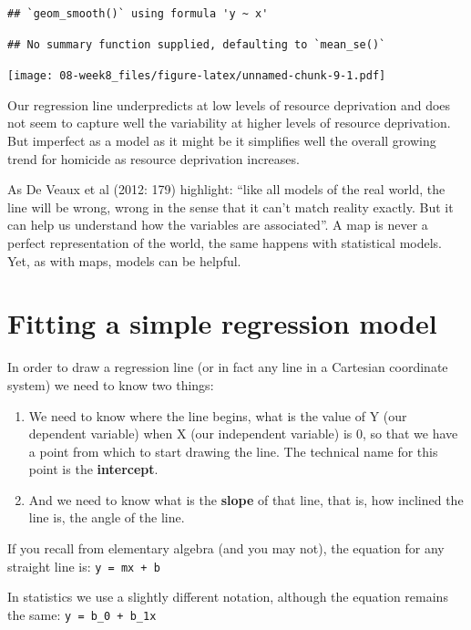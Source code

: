\documentclass[]{book}
\providecommand{\tightlist}{%
  \setlength{\itemsep}{0pt}\setlength{\parskip}{0pt}}
\begin{document}
\begin{verbatim}
## `geom_smooth()` using formula 'y ~ x'
\end{verbatim}

\begin{verbatim}
## No summary function supplied, defaulting to `mean_se()`
\end{verbatim}

\texttt{[image: 08-week8\_files/figure-latex/unnamed-chunk-9-1.pdf]}

Our regression line underpredicts at low levels of resource deprivation and does not seem to capture well the variability at higher levels of resource deprivation. But imperfect as a model as it might be it simplifies well the overall growing trend for homicide as resource deprivation increases.

As De Veaux et al (2012: 179) highlight: ``like all models of the real world, the line will be wrong, wrong in the sense that it can't match reality exactly. But it can help us understand how the variables are associated''. A map is never a perfect representation of the world, the same happens with statistical models. Yet, as with maps, models can be helpful.

\hypertarget{fitting-a-simple-regression-model}{%
\section{Fitting a simple regression model}\label{fitting-a-simple-regression-model}}

In order to draw a regression line (or in fact any line in a Cartesian coordinate system) we need to know two things:

\begin{enumerate}
\def\labelenumi{\arabic{enumi})}
\tightlist
\item
  We need to know where the line begins, what is the value of Y (our dependent variable) when X (our independent variable) is 0, so that we have a point from which to start drawing the line. The technical name for this point is the \textbf{intercept}.
\item
  And we need to know what is the \textbf{slope} of that line, that is, how inclined the line is, the angle of the line.
\end{enumerate}

If you recall from elementary algebra (and you may not), the equation for any straight line is:
\texttt{y\ =\ mx\ +\ b}

In statistics we use a slightly different notation, although the equation remains the same:
\texttt{y\ =\ b\_0\ +\ b\_1x}
\end{document}
